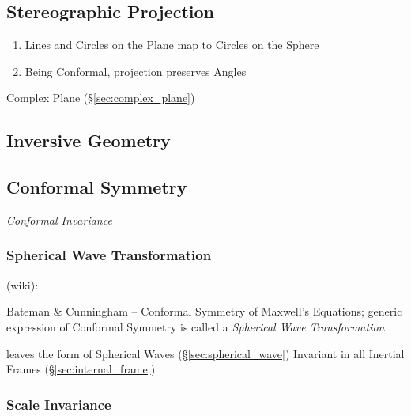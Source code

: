 \subsection{Stereographic Projection}\label{sec:stereographic_projection}

\begin{enumerate}
  \item Lines and Circles on the Plane map to Circles on the Sphere
  \item Being Conformal, projection preserves Angles
\end{enumerate}

Complex Plane (\S\ref{sec:complex_plane})



\subsection{Inversive Geometry}\label{sec:inversive_geometry}

\subsection{Conformal Symmetry}\label{sec:conformal_symmetry}

\emph{Conformal Invariance}



\subsubsection{Spherical Wave Transformation}
\label{sec:spherical_wave_transformation}

(wiki):

Bateman \& Cunningham -- Conformal Symmetry of Maxwell's Equations; generic
expression of Conformal Symmetry is called a \emph{Spherical Wave
  Transformation}

leaves the form of Spherical Waves (\S\ref{sec:spherical_wave}) Invariant in
all Inertial Frames (\S\ref{sec:internal_frame})



\subsubsection{Scale Invariance}\label{sec:scale_invariance}

